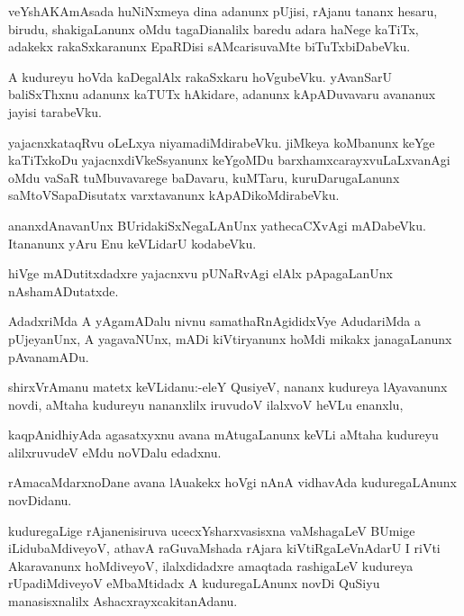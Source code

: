 \documentclass{article}
\begin{document}
\begin{mn}%
veYshAKAmAsada huNiNxmeya dina adanunx pUjisi, rAjanu tananx hesaru, birudu, shakigaLanunx 
oMdu tagaDianalilx baredu adara haNege kaTiTx, adakekx rakaSxkaranunx EpaRDisi 
sAMcarisuvaMte biTuTxbiDabeVku.
\end{mn}

\begin{mn}%
A kudureyu hoVda kaDegalAlx rakaSxkaru hoVgubeVku. yAvanSarU baliSxThxnu adanunx kaTUTx 
hAkidare, adanunx kApADuvavaru avananux jayisi tarabeVku.
\end{mn}

\begin{mn}%
yajacnxkataqRvu oLeLxya niyamadiMdirabeVku. jiMkeya koMbanunx keYge kaTiTxkoDu 
yajacnxdiVkeSsyanunx keYgoMDu barxhamxcarayxvuLaLxvanAgi oMdu vaSaR tuMbuvavarege 
baDavaru, kuMTaru, kuruDarugaLanunx saMtoVSapaDisutatx varxtavanunx kApADikoMdirabeVku.
\end{mn}

\begin{mn}%
ananxdAnavanUnx BUridakiSxNegaLAnUnx yathecaCXvAgi mADabeVku. Itananunx yAru Enu keVLidarU 
kodabeVku.
\end{mn}

\begin{mn}%
hiVge mADutitxdadxre yajacnxvu pUNaRvAgi elAlx pApagaLanUnx nAshamADutatxde.
\end{mn}

\begin{mn}%
AdadxriMda A yAgamADalu nivnu samathaRnAgididxVye AdudariMda a pUjeyanUnx, A yagavaNUnx, 
mADi kiVtiryanunx hoMdi mikakx janagaLanunx pAvanamADu.
\end{mn}

\begin{mn}%
shirxVrAmanu matetx keVLidanu:-eleY QusiyeV, nananx kudureya lAyavanunx novdi, aMtaha 
kudureyu nananxlilx iruvudoV ilalxvoV heVLu enanxlu,
\end{mn}

\begin{mn}%
kaqpAnidhiyAda agasatxyxnu avana mAtugaLanunx keVLi aMtaha kudureyu alilxruvudeV eMdu 
noVDalu edadxnu.
\end{mn}

\begin{mn}%
rAmacaMdarxnoDane avana lAuakekx hoVgi nAnA vidhavAda kuduregaLAnunx novDidanu.
\end{mn}

\begin{mn}%
kuduregaLige rAjanenisiruva ucecxYsharxvasisxna vaMshagaLeV BUmige iLidubaMdiveyoV, athavA 
raGuvaMshada rAjara kiVtiRgaLeVnAdarU I riVti Akaravanunx hoMdiveyoV, ilalxdidadxre 
amaqtada rashigaLeV kudureya rUpadiMdiveyoV eMbaMtidadx A kuduregaLAnunx novDi QuSiyu 
manasisxnalilx AshacxrayxcakitanAdanu.
\end{mn}
\end{document}
